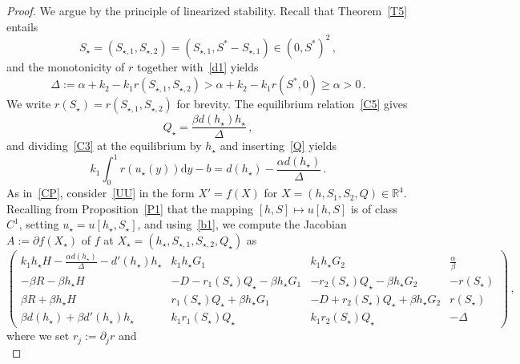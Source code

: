 \documentclass[reqno,11pt]{amsart}
\numberwithin{equation}{section}
\newcommand{\R}{\mathbb{R}}
\newcommand{\rd}{\mathrm{d}}
\begin{document}
\begin{proof}
We argue by the principle of linearized stability. Recall that Theorem~\ref{T5} entails
$$
S_{\star}=(S_{\star,1},S_{\star,2})=(S_{\star,1},S^*-S_{\star,1})\in (0,S^*)^2\,,
$$
and the monotonicity of $r$ together with~\eqref{d1} yields
\begin{equation}\label{Delta1}
\Delta:=\alpha+k_2-k_1r(S_{\star,1},S_{\star,2})>\alpha+k_2-k_1r(S^*,0)\ge\alpha>0\,.
\end{equation}
We write $r(S_{\star})=r(S_{\star,1},S_{\star,2})$ for brevity. The equilibrium relation~\eqref{C5} gives
\begin{equation}\label{Q}
Q_\star=\frac{\beta d(h_\star)h_\star}{\Delta}\,,
\end{equation}
and dividing~\eqref{C3} at the equilibrium by $h_\star$ and inserting~\eqref{Q} yields
\begin{equation}\label{b1}
 k_1\int_0^1 r(u_\star(y)) \rd y-b=d(h_\star)-\frac{\alpha d(h_\star)}{\Delta}\,.
\end{equation}
As in~\eqref{CP}, consider~\eqref{UU} in the form $X'=f(X)$ for $X=(h,S_1,S_2,Q)\in\R^4$. Recalling from Proposition~\ref{P1} that the mapping $[h,S]\mapsto u[h,S]$ is of class $C^1$, setting $u_\star=u[h_\star,S_\star]$, and using~\eqref{b1}, we compute the Jacobian $A:=\partial f( X_\star)$ of $f$ at  $X_\star=(h_\star,S_{\star,1},S_{\star,2},Q_\star)$  as
{\small\begin{equation*} 
\left(\begin{matrix}
   k_1 h_\star   H -\frac{\alpha  d(h_\star)}{\Delta}-d'(h_\star)  h_\star  &  k_1  h_\star   G_1 &  k_1  h_\star   G_2 & \frac{\alpha}{\beta}\\[4pt]
-\beta R-\beta h_\star H  &-D-r_1(S_\star)Q_\star-\beta h_\star  G_1  &-r_2(S_\star)Q_\star-\beta h_\star  G_2  & -r(S_\star)\\[4pt]
\beta R+\beta h_\star H  & r_1(S_\star)Q_\star+\beta h_\star  G_1 & -D+r_2(S_\star)Q_\star+\beta h_\star  G_2 & r(S_\star)\\[4pt]
\beta d(h_\star)+\beta d'(h_\star)h_\star  & k_1 r_1(S_\star) Q_\star &  k_1 r_2(S_\star) Q_\star & -\Delta
\end{matrix}\right)\,,
\end{equation*}}
where we set $r_j:=\partial_j r$ and
\begin{subequations}\label{Z}

\end{subequations}
\end{proof}
\end{document}
